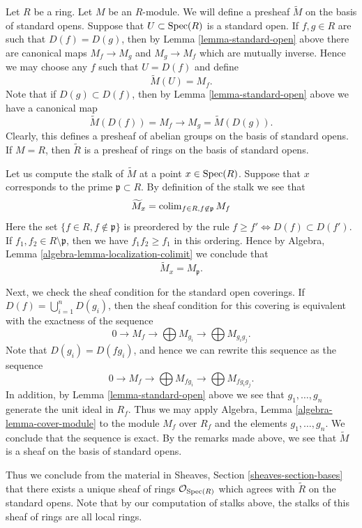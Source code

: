 \noindent
Let $R$ be a ring. Let $M$ be an $R$-module. We will define
a presheaf $\widetilde M$ on the basis of standard opens.
Suppose that $U \subset \mathop{\mathrm{Spec}}(R)$ is a standard open.
If $f, g \in R$ are such that $D(f) = D(g)$, then
by Lemma \ref{lemma-standard-open} above there are canonical
maps $M_f \to M_g$ and $M_g \to M_f$ which are mutually inverse.
Hence we may choose any $f$ such that $U = D(f)$
and define
$$
\widetilde M(U) = M_f.
$$
Note that if $D(g) \subset D(f)$, then by
Lemma \ref{lemma-standard-open} above we have
a canonical map
$$
\widetilde M(D(f)) = M_f \longrightarrow M_g = \widetilde M(D(g)).
$$
Clearly, this defines a presheaf of abelian groups on the basis
of standard opens. If $M = R$, then $\widetilde R$ is a presheaf
of rings on the basis of standard opens.

\medskip\noindent
Let us compute the stalk of $\widetilde M$ at a point $x \in \mathop{\mathrm{Spec}}(R)$.
Suppose that $x$ corresponds to the prime $\mathfrak p \subset R$.
By definition of the stalk we see that
$$
\widetilde M_x = \mathop{\mathrm{colim}}\nolimits_{f\in R, f\not\in \mathfrak p} M_f
$$
Here the set $\{f \in R, f \not \in \mathfrak p\}$ is preordered by
the rule $f \geq f' \Leftrightarrow D(f) \subset D(f')$.
If $f_1, f_2 \in R \setminus \mathfrak p$, then we have
$f_1f_2 \geq f_1$ in this ordering. Hence by
Algebra, Lemma \ref{algebra-lemma-localization-colimit}
we conclude that
$$
\widetilde M_x = M_{\mathfrak p}.
$$

\medskip\noindent
Next, we check the sheaf condition for the standard open coverings.
If $D(f) = \bigcup_{i = 1}^n D(g_i)$, then the sheaf condition
for this covering is equivalent with the exactness of the
sequence
$$
0 \to M_f \to \bigoplus M_{g_i} \to \bigoplus M_{g_ig_j}.
$$
Note that $D(g_i) = D(fg_i)$, and hence we can rewrite this
sequence as the sequence
$$
0 \to M_f \to \bigoplus M_{fg_i} \to \bigoplus M_{fg_ig_j}.
$$
In addition, by Lemma \ref{lemma-standard-open} above
we see that $g_1, \ldots, g_n$ generate the unit ideal
in $R_f$. Thus we may apply
Algebra, Lemma \ref{algebra-lemma-cover-module}
to the module $M_f$ over $R_f$ and the elements $g_1, \ldots, g_n$.
We conclude that the sequence is exact. By the remarks
made above, we see that $\widetilde M$ is a sheaf
on the basis of standard opens.

\medskip\noindent
Thus we conclude from the material in
Sheaves, Section \ref{sheaves-section-bases}
that there exists a
unique sheaf of rings $\mathcal{O}_{\mathop{\mathrm{Spec}}(R)}$
which agrees with $\widetilde R$ on the standard opens.
Note that by our computation of stalks above, the
stalks of this sheaf of rings are all local rings.

